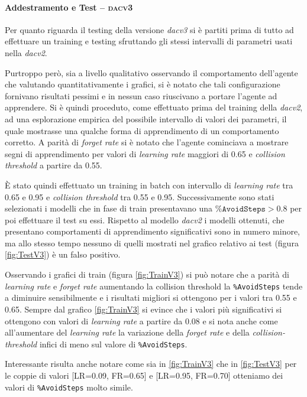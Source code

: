 \newpage

\paragraph{Addestramento e Test -- \textsc{dacv3}} \label{par:dacv3}\hfill

Per quanto riguarda il testing della versione \textit{dacv3} si è partiti prima di tutto ad effettuare un training e testing sfruttando gli stessi intervalli di parametri usati nella \textit{dacv2}. 

Purtroppo però, sia a livello qualitativo osservando il comportamento dell'agente che valutando quantitativamente i grafici, si è notato che tali configurazione fornivano risultati pessimi e in nessun caso riuscivano a portare l'agente ad apprendere. 
Si è quindi proceduto, come effettuato prima del training della \textit{dacv2}, ad una esplorazione empirica del possibile intervallo di valori dei parametri, il quale mostrasse una qualche forma di apprendimento di un comportamento corretto. A parità di \textit{forget rate} si è notato che l'agente cominciava a mostrare segni di apprendimento per valori di \textit{learning rate} maggiori di 0.65 e \textit{collision threshold} a partire da 0.55. 

È stato quindi effettuato un training in batch con intervallo di \textit{learning rate} tra 0.65 e 0.95 e \textit{collision threshold} tra 0.55 e 0.95. Successivamente sono stati selezionati i modelli che in fase di train presentavano una $\texttt{\%AvoidSteps} > 0.8$ per poi effettuare il test su essi.
Rispetto al modello \textit{dacv2} i modelli ottenuti, che presentano comportamenti di apprendimento significativi sono in numero minore, ma allo stesso tempo nessuno di quelli mostrati nel grafico relativo ai test (figura \ref{fig:TestV3}) è un falso positivo.

Osservando i grafici di train (figura \ref{fig:TrainV3}) si può notare che a parità di \textit{learning rate} e \textit{forget rate} aumentando la collision threshold la \texttt{\%AvoidSteps} tende a diminuire sensibilmente e i risultati migliori si ottengono per i valori tra 0.55 e 0.65. 
Sempre dal grafico \ref{fig:TrainV3} si evince che i valori più significativi si ottengono con valori di \textit{learning rate} a partire da 0.08 e si nota anche come all'aumentare del \textit{learning rate} la variazione della \textit{forget rate} e della \textit{collision-threshold} infici di meno sul valore di \texttt{\%AvoidSteps}.

Interessante risulta anche notare come sia in \ref{fig:TrainV3} che in \ref{fig:TestV3} per le coppie di valori [LR=0.09, FR=0.65] e [LR=0.95, FR=0.70] otteniamo dei valori di \texttt{\%AvoidSteps} molto simile.

